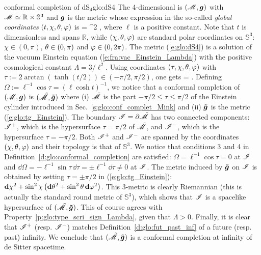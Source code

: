\begin{texample}{conformal completion of dS$_{4}$}{glo:dS4}
The 4-dimensional  is
$(\mathscr{M},\bm{g})$ with $\mathscr{M}\simeq \mathbb{R}\times\mathbb{S}^3$ and $\bm{g}$ is the metric
whose expression in the so-called \emph{global coordinates}
$(t,\chi,\theta,\varphi)$ is
\be \label{e:glo:dS4}
     = \ell^2  ,
\ee
where $\ell$ is a positive constant. Note that $t$ is dimensionless and spans $\mathbb{R}$,
while $(\chi,\theta,\varphi)$ are standard polar coordinates on $\mathbb{S}^3$:
$\chi\in(0,\pi)$, $\theta\in(0,\pi)$ and $\varphi\in(0,2\pi)$.
 The metric (\ref{e:glo:dS4}) is a solution
of the vacuum Einstein equation (\ref{e:fra:vac_Einstein_Lambda}) with
the positive cosmological constant $\Lambda = 3/\ell^2$.
Using coordinates $(\tau,\chi,\theta,\varphi)$ with
$\tau := 2\arctan(\tanh(t/2)) \in (-\pi/2,\pi/2)$, one gets
\be
     =   .
\ee
Defining $\Omega := \ell^{-1}\cos\tau = (\ell\cosh t)^{-1}$, we notice that
a conformal completion of $(\mathscr{M},\bm{g})$ is $(\tilde{\mathscr{M}},\bm{\tilde{g}})$
where (i) $\tilde{\mathscr{M}}$ is the part $-\pi/2\leq \tau \leq \pi/2$ of the Einstein cylinder
introduced in Sec.~\ref{s:glo:conf_complet_Mink}
and (ii)  $\bm{\tilde{g}}$ is the metric (\ref{e:glo:tg_Einstein}).
The boundary $\mathscr{I} = \partial\tilde{\mathscr{M}}$ has two connected components:
$\mathscr{I}^+$, which is the hypersurface $\tau = \pi/2$ of $\tilde{\mathscr{M}}$, and
$\mathscr{I}^-$, which is the hypersurface $\tau = -\pi/2$.
Both $\mathscr{I}^+$ and $\mathscr{I}^-$ are spanned by the coordinates $(\chi,\theta,\varphi)$
and their topology is that of $\mathbb{S}^3$.
We notice that conditions 3 and 4 in Definition~\ref{d:glo:conformal_completion}
are satisfied: $\Omega = \ell^{-1} \cos\tau = 0$ at $\mathscr{I}$ and
$\dd\Omega = - \ell^{-1} \sin\tau\, \dd\tau = \pm \ell^{-1} \dd\tau \not = 0 $
at $\mathscr{I}$.
The metric induced by $\bm{\tilde{g}}$ on $\mathscr{I}$ is obtained by
setting $\tau=\pm\pi/2$ in (\ref{e:glo:tg_Einstein}):
$\mathbf{d} \chi^2 + \sin^2\chi \left( \mathbf{d}\theta^2 + \sin^2\theta \, \mathbf{d}\varphi^2 \right) $.
This 3-metric is clearly Riemannian (this is actually the standard round metric
of $\mathbb{S}^3$), which shows that $\mathscr{I}$ is a spacelike
hypersurface of $(\tilde{\mathscr{M}},\bm{\tilde{g}})$. This of course agrees with
Property~\ref{p:glo:type_scri_sign_Lambda}, given that $\Lambda > 0$.
Finally, it is clear that $\mathscr{I}^+$ (resp. $\mathscr{I}^-$)
matches Definition~\ref{d:glo:fut_past_inf} of a future (resp. past) infinity.
We conclude that $(\tilde{\mathscr{M}},\bm{\tilde{g}})$ is a conformal completion at infinity
of de Sitter spacetime.
\end{texample}

